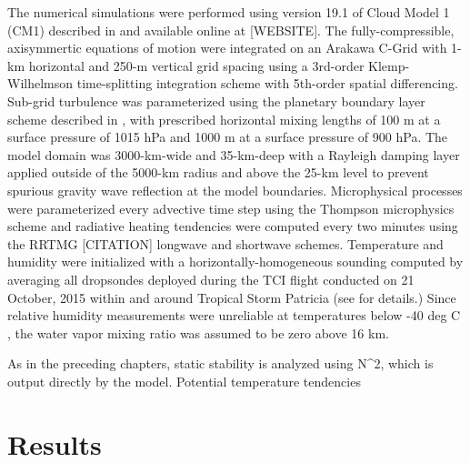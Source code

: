 The numerical simulations were performed using version 19.1 of Cloud Model 1 (CM1) described in \cite{BryanRotunno2009} and available online at [WEBSITE].
The fully-compressible, axisymmertic equations of motion were integrated on an Arakawa C-Grid with 1-km horizontal and 250-m vertical grid spacing using a 3rd-order Klemp-Wilhelmson time-splitting integration scheme with 5th-order spatial differencing.
Sub-grid turbulence was parameterized using the planetary boundary layer scheme described in \cite{BryanRotunno2009}, with prescribed horizontal mixing lengths of 100 m at a surface pressure of 1015 hPa and 1000 m at a surface pressure of 900 hPa. 
The model domain was 3000-km-wide and 35-km-deep with a Rayleigh damping layer applied outside of the 5000-km radius and above the 25-km level to prevent spurious gravity wave reflection at the model boundaries.
Microphysical processes were parameterized every advective time step using the Thompson microphysics scheme \cite{Thompson} and radiative heating tendencies were computed every two minutes using the RRTMG [CITATION] longwave and shortwave schemes. 
Temperature and humidity were initialized with a horizontally-homogeneous sounding computed by averaging all dropsondes deployed during the TCI flight conducted on 21 October, 2015 within and around Tropical Storm Patricia (see \cite{DoyleTCI} for details.)
Since relative humidity measurements were unreliable at temperatures below -40 deg C \cite{BellTCI}, the water vapor mixing ratio was assumed to be zero above 16 km.

 
As in the preceding chapters, static stability is analyzed using N^2, which is output directly by the model. Potential temperature tendencies 

\section{Results}

